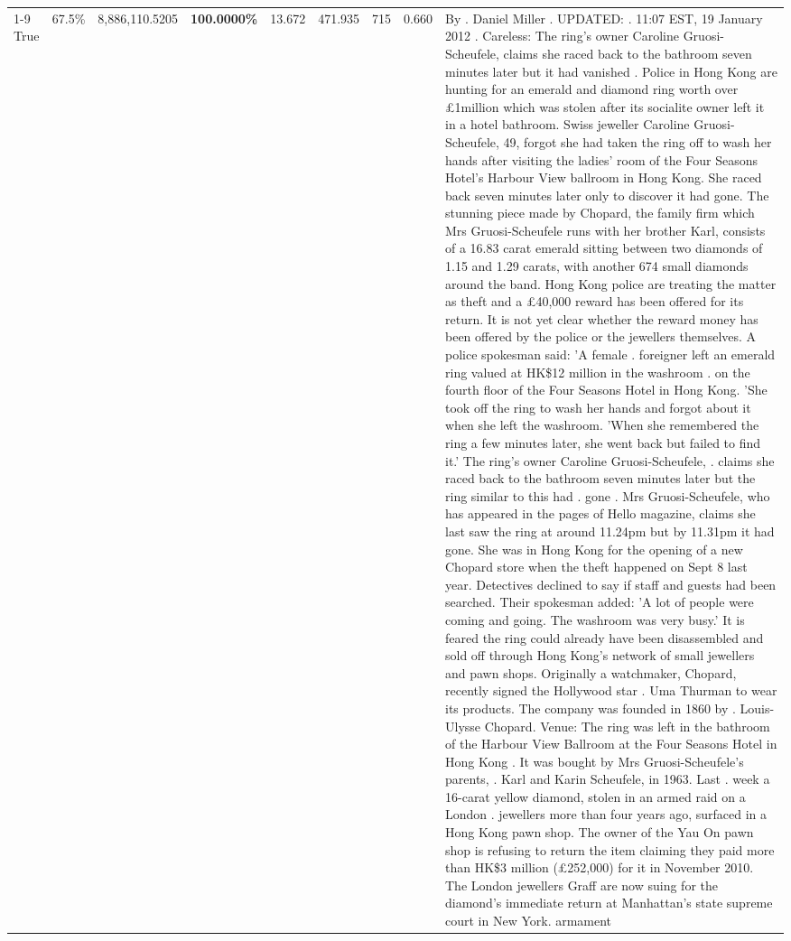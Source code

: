 \begin{table}[H]
\begin{tabular}{lllrlllll}
\cline{1-9}
True & 67.5\% & 8,886,110.5205 & \bfseries \color{red} 100.0000\% & 13.672 & 471.935 & 715 & 0.660 & By . Daniel Miller . UPDATED: . 11:07 EST, 19 January 2012 . Careless: The ring's owner Caroline Gruosi-Scheufele, claims she raced back to the bathroom seven minutes later but it had vanished . Police in Hong Kong are hunting for an emerald and diamond ring worth over £1million which was stolen after its socialite owner left it in a hotel bathroom. Swiss jeweller Caroline Gruosi-Scheufele, 49, forgot she had taken the ring off to wash her hands after visiting the ladies' room of the Four Seasons Hotel's Harbour View ballroom in Hong Kong. She raced back seven minutes later only to discover it had gone. The stunning piece made by Chopard, the family firm which Mrs Gruosi-Scheufele runs with her brother Karl, consists of a 16.83 carat emerald sitting between two diamonds of 1.15 and 1.29 carats, with another 674 small diamonds around the band. Hong Kong police are treating the matter as theft and a £40,000 reward has been offered for its return. It is not yet clear whether the reward money has been offered by the police or the jewellers themselves. A police spokesman said: 'A female . foreigner left an emerald ring valued at HK\$12 million in the washroom . on the fourth floor of the Four Seasons Hotel in Hong Kong. 'She took off the ring to wash her hands and forgot about it when she left the washroom. 'When she remembered the ring a few minutes later, she went back but failed to find it.' The ring's owner Caroline Gruosi-Scheufele, . claims she raced back to the bathroom seven minutes later but the ring similar to this had . gone . Mrs Gruosi-Scheufele, who has appeared in the pages of Hello magazine, claims she last saw the ring at around 11.24pm but by 11.31pm it had gone. She was in Hong Kong for the opening of a new Chopard store when the theft happened on Sept 8 last year. Detectives declined to say if staff and guests had been searched. Their spokesman added: 'A lot of people were coming and going. The washroom was very busy.' It is feared the ring could already have been disassembled and sold off through Hong Kong's network of small jewellers and pawn shops. Originally a watchmaker, Chopard, recently signed the Hollywood star . Uma Thurman to wear its products. The company was founded in 1860 by . Louis-Ulysse Chopard. Venue: The ring was left in the bathroom of the Harbour View Ballroom at the Four Seasons Hotel in Hong Kong . It was bought by Mrs Gruosi-Scheufele's  parents, . Karl and Karin Scheufele, in 1963. Last . week a 16-carat yellow diamond, stolen in an armed raid on a London . jewellers more than four years ago, surfaced in a Hong Kong pawn shop. The owner of the Yau On pawn shop is refusing to return the item claiming they paid more than HK\$3 million (£252,000) for it in November 2010. The London jewellers Graff are now suing for the diamond’s immediate return at Manhattan’s state supreme court in New York. armament \\

\end{tabular}
\end{table}
